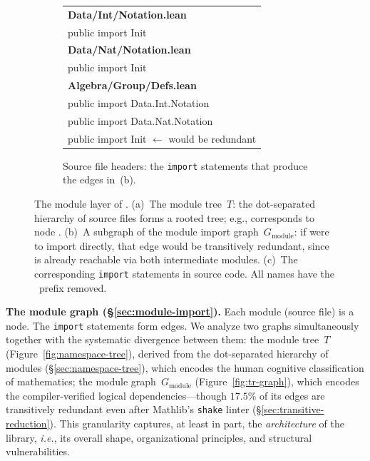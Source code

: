 \begin{figure}[!htb]
\begin{subfigure}[t]{0.60\textwidth}
\centering
\scriptsize\ttfamily
\begin{tabular}[t]{@{}l@{}}
  \textnormal{\sffamily\bfseries\color{blue!60!black} Data/Int/Notation.lean} \\[1pt]
  \hspace{1em}public import \textcolor{blue!60!black}{Init} \\[5pt]
  \textnormal{\sffamily\bfseries\color{blue!60!black} Data/Nat/Notation.lean} \\[1pt]
  \hspace{1em}public import \textcolor{blue!60!black}{Init} \\[5pt]
  \textnormal{\sffamily\bfseries\color{blue!60!black} Algebra/Group/Defs.lean} \\[1pt]
  \hspace{1em}public import \textcolor{blue!60!black}{Data.Int.Notation} \\
  \hspace{1em}public import \textcolor{blue!60!black}{Data.Nat.Notation} \\
  \hspace{1em}\textcolor{orange!80!red}{public import \textcolor{blue!60!black}{Init}}
    \textnormal{\sffamily\color{orange!80!red} $\leftarrow$ would be redundant} \\
\end{tabular}
\caption{Source file headers: the \texttt{import} statements that produce the edges in~(b).}
\label{fig:tr-source}
\end{subfigure}
\caption{The module layer of . (a)~The module tree~$T$: the dot-separated hierarchy of source files forms a rooted tree; e.g.,  corresponds to node . (b)~A subgraph of the module import graph~$G_{\mathrm{module}}$: if  were to import  directly, that edge would be transitively redundant, since  is already reachable via both intermediate modules. (c)~The corresponding \texttt{import} statements in source code. All names have the \ prefix removed.}
\label{fig:prefix-tree}
\end{figure}

\medskip
\noindent\textbf{The module graph (\S\ref{sec:module-import}).}
Each module (source file) is a node. The \texttt{import} statements form edges. We analyze two graphs simultaneously together with the systematic divergence between them: the module tree~$T$ (Figure~\ref{fig:namespace-tree}), derived from the dot-separated hierarchy of modules (\S\ref{sec:namespace-tree}), which encodes the human cognitive classification of mathematics; the module graph~$G_{\mathrm{module}}$ (Figure~\ref{fig:tr-graph}), which encodes the compiler-verified logical dependencies---though $17.5\%$ of its edges are transitively redundant even after Mathlib's \texttt{shake} linter (\S\ref{sec:transitive-reduction}). This granularity captures, at least in part, the \emph{architecture} of the library, \emph{i.e.}, its overall shape, organizational principles, and structural vulnerabilities.

